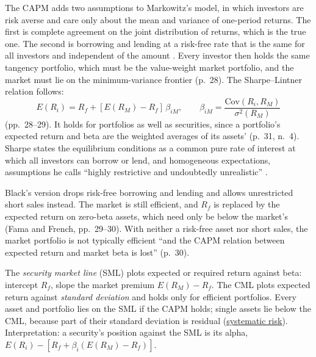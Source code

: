\begin{qfmodel}\label{mod:capm-sml}
 The CAPM adds two assumptions to Markowitz's model, in which investors are risk averse and care only about the mean and variance of one-period returns. The first is complete agreement on the joint distribution of returns, which is the true one. The second is borrowing and lending at a risk-free rate that is the same for all investors and independent of the amount \citep[\emph{JEP} 18(3), 2004, p.~26]{capm-theory-evidence-2004}. Every investor then holds the same tangency portfolio, which must be the value-weight market portfolio, and the market must lie on the minimum-variance frontier (p.~28). The Sharpe--Lintner relation follows:
\[ E(R_i)=R_f+[E(R_M)-R_f]\,\beta_{iM},\qquad \beta_{iM}=\frac{\mathrm{Cov}(R_i,R_M)}{\sigma^2(R_M)} \]
(pp.~28--29). It holds for portfolios as well as securities, since a portfolio's expected return and beta are the weighted averages of its assets' (p.~31, n.~4). Sharpe states the equilibrium conditions as a common pure rate of interest at which all investors can borrow or lend, and homogeneous expectations, assumptions he calls ``highly restrictive and undoubtedly unrealistic'' \citep[\emph{Journal of Finance} 19(3), 1964, pp.~433--434]{capital-asset-prices-1964}.

Black's version drops risk-free borrowing and lending and allows unrestricted short sales instead. The market is still efficient, and $R_f$ is replaced by the expected return on zero-beta assets, which need only be below the market's (Fama and French, pp.~29--30). With neither a risk-free asset nor short sales, the market portfolio is not typically efficient ``and the CAPM relation between expected return and market beta is lost'' (p.~30).

 The \emph{security market line} (SML) plots expected or required return against beta: intercept $R_f$, slope the market premium $E(R_M)-R_f$. The CML plots expected return against \emph{standard deviation} and holds only for efficient portfolios. Every asset and portfolio lies on the SML if the CAPM holds; single assets lie below the CML, because part of their standard deviation is residual (\hyperref[mech:systematic-risk-pricing]{systematic risk}). Interpretation: a security's position against the SML is its alpha, $E(R_i)-[R_f+\beta_i(E(R_M)-R_f)]$.


\end{qfmodel}
